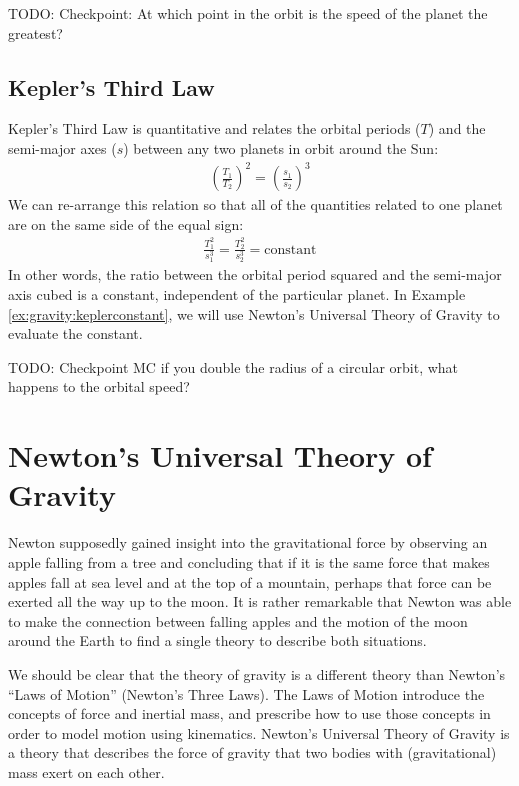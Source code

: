 TODO: Checkpoint: At which point in the orbit is the speed of the planet the greatest?

\subsection{Kepler's Third Law}
Kepler's Third Law is quantitative and relates the orbital periods ($T$) and the semi-major axes ($s$) between any two planets in orbit around the Sun:
\begin{align*}
\left(\frac{T_1}{T_2}\right)^2=\left(\frac{s_1}{s_2}\right)^3
\end{align*}
We can re-arrange this relation so that all of the quantities related to one planet are on the same side of the equal sign:
\begin{align*}
\frac{T_1^2}{s_1^3}=\frac{T_2^2}{s_2^3}=\text{constant}
\end{align*}
In other words, the ratio between the orbital period squared and the semi-major axis cubed is a constant, independent of the particular planet. In Example \ref{ex:gravity:keplerconstant}, we will use Newton's Universal Theory of Gravity to evaluate the constant.

TODO: Checkpoint MC if you double the radius of a circular orbit, what happens to the orbital speed?

\section{Newton's Universal Theory of Gravity}
Newton supposedly gained insight into the gravitational force by observing an apple falling from a tree and concluding that if it is the same force that makes apples fall at sea level and at the top of a mountain, perhaps that force can be exerted all the way up to the moon. It is rather remarkable that Newton was able to make the connection between falling apples and the motion of the moon around the Earth to find a single theory to describe both situations.

We should be clear that the theory of gravity is a different theory than Newton's ``Laws of Motion'' (Newton's Three Laws). The Laws of Motion introduce the concepts of force and inertial mass, and prescribe how to use those concepts in order to model motion using kinematics. Newton's Universal Theory of Gravity is a theory that describes the force of gravity that two bodies with (gravitational) mass exert on each other.

